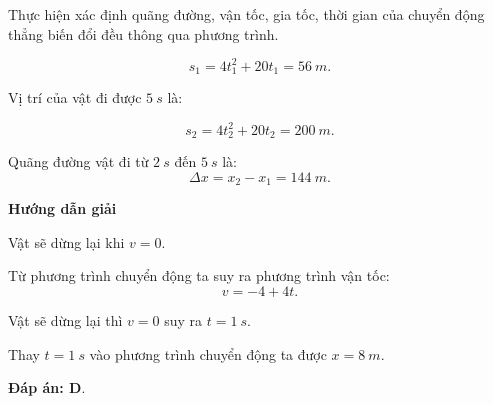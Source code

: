 \begin{dang}{Thực hiện xác định quãng đường, vận tốc, gia tốc, thời gian của chuyển động thẳng biến đổi đều thông qua phương trình.}
{		$$s_1 = 4t_1^2 + 20t_1 =\SI{56}{m}.$$
		
		Vị trí của vật đi được $\SI{5}{s}$ là:
		
		$$s_2 = 4t_2^2 + 20t_2 =\SI{200}{m}.$$
		
		Quãng đường vật đi từ $\SI{2}{s}$  đến $\SI{5}{s}$ là:
		$$\Delta x = x_2 - x_1 = \SI{144}{m}.$$
		
	}
	{	\begin{center}
			\textbf{Hướng dẫn giải}
		\end{center}
		
		Vật sẽ dừng lại khi $v = 0$.
		
		Từ phương trình chuyển động ta suy ra phương trình vận tốc: $$v = - 4 + 4t.$$
		
		Vật sẽ dừng lại thì $v=0$ suy ra $t =\SI{1}{s}.$
		
		Thay $t =\SI{1}{s}$ vào phương trình chuyển động ta được $x = \SI{8}{m}.$
		
		\textbf{Đáp án: D}.
	}
\end{dang}
